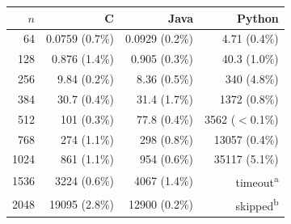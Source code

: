 \begin{tabular}{rrrr}
\toprule
$n$ & C & Java & Python \\
\midrule
64 & 0.0759 (0.7\%) & 0.0929 (0.2\%) & 4.71 (0.4\%) \\
128 & 0.876 (1.4\%) & 0.905 (0.3\%) & 40.3 (1.0\%) \\
256 & 9.84 (0.2\%) & 8.36 (0.5\%) & 340 (4.8\%) \\
384 & 30.7 (0.4\%) & 31.4 (1.7\%) & 1372 (0.8\%) \\
512 & 101 (0.3\%) & 77.8 (0.4\%) & 3562 ($<$0.1\%) \\
768 & 274 (1.1\%) & 298 (0.8\%) & 13057 (0.4\%) \\
1024 & 861 (1.1\%) & 954 (0.6\%) & 35117 (5.1\%) \\
1536 & 3224 (0.6\%) & 4067 (1.4\%) & timeout\textsuperscript{a} \\
2048 & 19095 (2.8\%) & 12900 (0.2\%) & skipped\textsuperscript{b} \\
\bottomrule
\end{tabular}
\par{}
